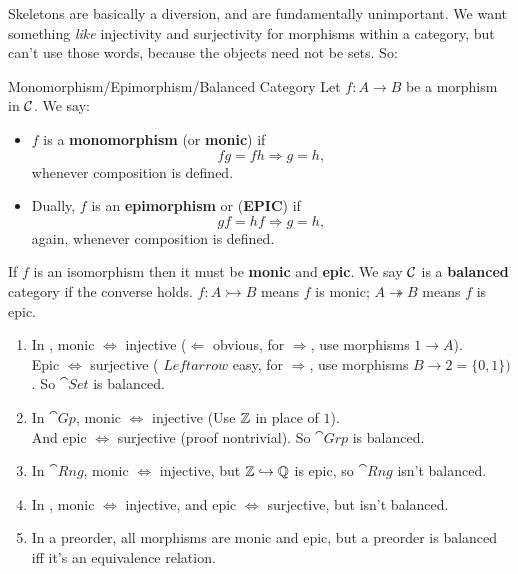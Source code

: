 \documentclass{article}
\begin{document}
Skeletons are basically a diversion, and are fundamentally unimportant. \gap We want something \textit{like} injectivity and surjectivity for morphisms within a category, but can't use those words, because the objects need not be sets. So:
\begin{fancydefine}{Monomorphism/Epimorphism/Balanced Category}
    Let $f: A \to B$ be a morphism in $\mathcal{C}$. We say: \begin{itemize}
        \item $f$ is a \textbf{monomorphism} (or \textbf{monic}) if \[fg = fh \Rightarrow g=h,\] whenever composition is defined.
        \item Dually, $f$ is an \textbf{epimorphism} or (\large\textbf{EPIC}\normalsize) if \[ gf=hf \Rightarrow g=h,\] again, whenever composition is defined.
    \end{itemize}
    If $f$ is an isomorphism then it must be \textbf{monic} and \textbf{epic}. We say $\mathcal{C}$ is a \textbf{balanced} category if the converse holds. \gap $f : A \rightarrowtail B$ means $f$ is monic; $A \twoheadrightarrow B$ means $f$ is epic.  
    
\end{fancydefine}
\exs \begin{enumerate}
    \item[(a)] In , monic $\Leftrightarrow$ injective ($\Leftarrow$ obvious, for $\Rightarrow$, use morphisms $1 \to A$).\\ Epic $\Leftrightarrow$ surjective ( $Leftarrow$ easy, for $\Rightarrow$, use morphisms $B \to 2 = \{0,1\})$. So $\cat{Set}$ is balanced.
    \item[(b)] In $\cat{Gp}$, monic $\Leftrightarrow$ injective (Use $\mathbb{Z}$ in place of $1$).\\ And epic $\Leftrightarrow$ surjective (proof nontrivial). So $\cat{Grp}$ is balanced.
    \item[(c)] In $\cat{Rng}$, monic $\Leftrightarrow$ injective, but $\mathbb{Z} \hookrightarrow \mathbb{Q}$ is epic, so $\cat{Rng}$ isn't balanced.
    \item[(d)] In , monic $\Leftrightarrow$ injective, and epic $\Leftrightarrow$ surjective, but  isn't balanced.
    \item[(e)] In a preorder, all morphisms are monic and epic, but a preorder is balanced iff it's an equivalence relation. 
\end{enumerate}
\end{document}
